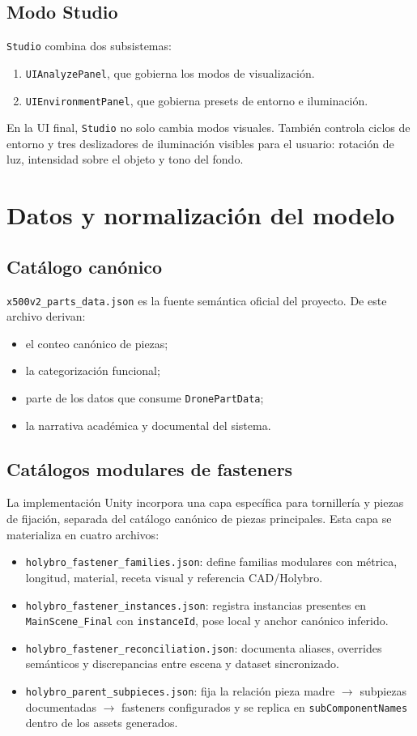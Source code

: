 \documentclass[12pt,letterpaper]{article}
\begin{document}
\subsection{Modo Studio}
\texttt{Studio} combina dos subsistemas:
\begin{enumerate}
    \item \texttt{UIAnalyzePanel}, que gobierna los modos de visualización.
    \item \texttt{UIEnvironmentPanel}, que gobierna presets de entorno e iluminación.
\end{enumerate}

\noindent En la UI final, \texttt{Studio} no solo cambia modos visuales. También controla ciclos de entorno y tres deslizadores de iluminación visibles para el usuario: rotación de luz, intensidad sobre el objeto y tono del fondo.

\section{Datos y normalización del modelo}

\subsection{Catálogo canónico}
\texttt{x500v2\_parts\_data.json} es la fuente semántica oficial del proyecto. De este archivo derivan:
\begin{itemize}
    \item el conteo canónico de piezas;
    \item la categorización funcional;
    \item parte de los datos que consume \texttt{DronePartData};
    \item la narrativa académica y documental del sistema.
\end{itemize}

\subsection{Catálogos modulares de fasteners}
La implementación Unity incorpora una capa específica para tornillería y piezas de fijación, separada del catálogo canónico de piezas principales. Esta capa se materializa en cuatro archivos:
\begin{itemize}
    \item \texttt{holybro\_fastener\_families.json}: define familias modulares con métrica, longitud, material, receta visual y referencia CAD/Holybro.
    \item \texttt{holybro\_fastener\_instances.json}: registra instancias presentes en \texttt{MainScene\_Final} con \texttt{instanceId}, pose local y anchor canónico inferido.
    \item \texttt{holybro\_fastener\_reconciliation.json}: documenta aliases, overrides semánticos y discrepancias entre escena y dataset sincronizado.
    \item \texttt{holybro\_parent\_subpieces.json}: fija la relación pieza madre $\rightarrow$ subpiezas documentadas $\rightarrow$ fasteners configurados y se replica en \texttt{subComponentNames} dentro de los assets generados.
\end{itemize}
\end{document}
